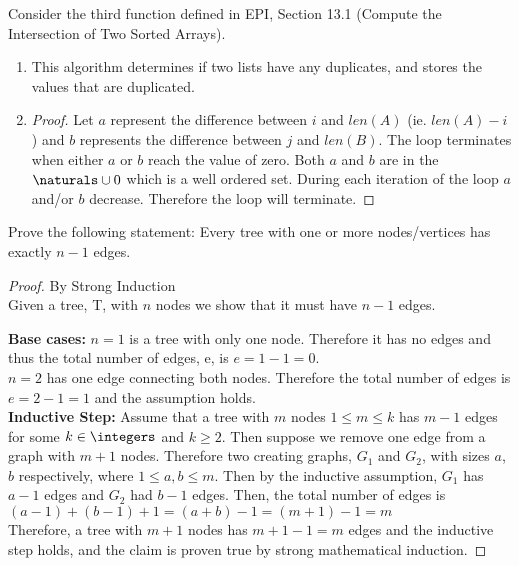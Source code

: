 \documentclass{article}
\author{Elliott Pryor}
\date{due: 6 September 2019}
\begin{document}
\nextprob
Consider the third function defined in EPI, Section 13.1 (Compute the
Intersection of Two Sorted Arrays).
\begin{enumerate}
    \item This algorithm determines if two lists have any duplicates, and stores the values that are duplicated.
    \item 
\begin{proof}
Let $a$ represent the difference between $i$ and $len(A)$ (ie. $len(A) - i$) and $b$ represents the difference between $j$ and $len(B)$. The loop terminates when either $a$ or $b$ reach the value of zero. Both $a$ and $b$ are in the $\naturals \cup 0$ which is a well ordered set. During each iteration of the loop $a$ and/or $b$ decrease. Therefore the loop will terminate. 
\end{proof}    
    
\end{enumerate}

\nextprob
Prove the following statement: Every tree with one or more nodes/vertices has
exactly $n-1$ edges.

\begin{proof} By Strong Induction\\
Given a tree, T, with $n$ nodes we show that it must have $n-1$ edges. 

\textbf{Base cases: } $n = 1$ is a tree with only one node. Therefore it has no edges and thus the total number of edges, e, is $e = 1 - 1 = 0$.\\
$n = 2$ has one edge connecting both nodes. Therefore the total number of edges is $e = 2 - 1 = 1$ and the assumption holds.\\

\textbf{Inductive Step: } Assume that a tree with $m$ nodes $1 \leq m \leq k$ has $m - 1$ edges for some $k \in \integers$ and $k \geq 2$. Then suppose we remove one edge from a graph with $m + 1$ nodes. Therefore two creating graphs, $G_1$ and $G_2$, with sizes $a$, $b$ respectively, where $1 \leq a,b \leq m$. Then by the inductive assumption, $G_1$ has $a-1$ edges and $G_2$ had $b-1$ edges. Then, the total number of edges is\\
$(a-1) + (b-1) + 1 = (a + b) - 1 = (m + 1) - 1 = m$\\
Therefore, a tree with $m + 1$ nodes has $m + 1 - 1 = m$ edges and the inductive step holds, and the claim is proven true by strong mathematical induction. 
\end{proof}
\end{document}
